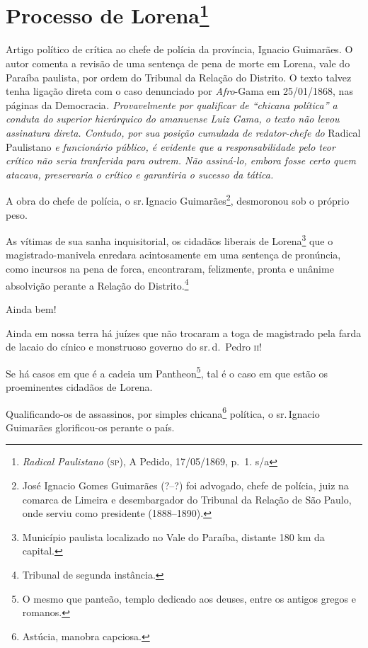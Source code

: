 \chapter{Processo de Lorena\footnote{\emph{Radical Paulistano} (\textsc{sp}), A
  Pedido, 17/05/1869, p.~1. s/a}}

\begin{didascalia}
Artigo político de crítica ao chefe de polícia da província, Ignacio
Guimarães. O autor comenta a revisão de uma sentença de pena de morte em
Lorena, vale do Paraíba paulista, por ordem do Tribunal da Relação do
Distrito. O texto talvez tenha ligação direta com o caso denunciado
por\emph{ Afro}-Gama em 25/01/1868, nas páginas da Democracia\emph{.
Provavelmente por qualificar de ``chicana política'' a conduta do superior
hierárquico do amanuense Luiz Gama, o texto não levou assinatura direta.
Contudo, por sua posição cumulada de redator-chefe do} Radical
Paulistano \emph{e funcionário público, é evidente que a
responsabilidade pelo teor crítico não seria tranferida para outrem. Não
assiná-lo, embora fosse certo quem atacava, preservaria o crítico e
garantiria o sucesso da tática.}
\end{didascalia}



A obra do chefe de polícia, o sr.\,Ignacio Guimarães\footnote{José
  Ignacio Gomes Guimarães (?--?) foi advogado, chefe de polícia, juiz na
  comarca de Limeira e desembargador do Tribunal da Relação de São
  Paulo, onde serviu como presidente (1888--1890).}, desmoronou sob o
próprio peso.

As vítimas de sua sanha inquisitorial, os cidadãos liberais de
Lorena\footnote{Município paulista localizado no Vale do Paraíba,
  distante 180 km da capital.} que o magistrado-manivela enredara
acintosamente em uma sentença de pronúncia, como incursos na pena de
forca, encontraram, felizmente, pronta e unânime absolvição perante a
Relação do Distrito.\footnote{Tribunal de segunda instância.}

Ainda bem!

Ainda em nossa terra há juízes que não trocaram a toga de magistrado
pela farda de lacaio do cínico e monstruoso governo do sr.\,d.~Pedro \textsc{ii}!

Se há casos em que é a cadeia um Pantheon\footnote{O mesmo que
  panteão, templo dedicado aos deuses, entre os antigos gregos e
  romanos.}, tal é o caso em que estão os proeminentes cidadãos de
Lorena.

Qualificando-os de assassinos, por simples chicana\footnote{Astúcia,
  manobra capciosa.} política, o sr.\,Ignacio Guimarães glorificou-os
perante o país.

